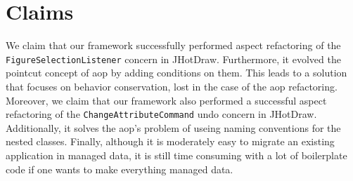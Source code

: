 \section{Claims}
We claim that our framework successfully performed aspect refactoring of the \texttt{FigureSelectionListener} concern in JHotDraw.
Furthermore, it evolved the pointcut concept of \ac{aop} by adding conditions on them.
This leads to a solution that focuses on behavior conservation, lost in the case of the \ac{aop} refactoring.
Moreover, we claim that our framework also performed a successful aspect refactoring of the \texttt{ChangeAttributeCommand} undo concern in JHotDraw.
Additionally, it solves the \ac{aop}'s problem of useing naming conventions for the nested classes.
Finally, although it is moderately easy to migrate an existing application in managed data, it is still time consuming with a lot of boilerplate code if one wants to make everything managed data.
